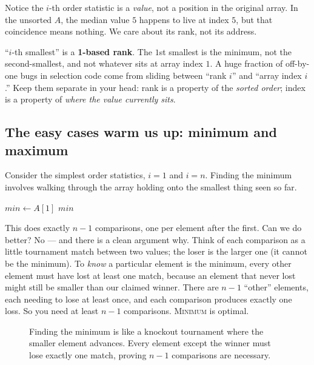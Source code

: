 Notice the $i$-th order statistic is a \emph{value}, not a position in the original
array. In the unsorted $A$, the median value $5$ happens to live at index $5$, but
that coincidence means nothing. We care about its rank, not its address.

\begin{trapbox}
``$i$-th smallest'' is a \textbf{1-based rank}. The $1$st smallest is the minimum,
not the second-smallest, and not whatever sits at array index $1$. A huge fraction
of off-by-one bugs in selection code come from sliding between ``rank $i$'' and
``array index $i$.'' Keep them separate in your head: rank is a property of the
\emph{sorted order}; index is a property of \emph{where the value currently sits}.
\end{trapbox}

\subsection{The easy cases warm us up: minimum and maximum}

Consider the simplest order statistics, $i=1$ and $i=n$. Finding the minimum involves walking through the array holding onto the smallest thing seen so far.

\begin{algorithm}[H]
\caption{\textsc{Minimum}$(A)$}\label{ch09:alg-minimum}
$\textit{min} \gets A[1]$\;
\Return $\textit{min}$\;
\end{algorithm}

This does exactly $n-1$ comparisons, one per element after the first. Can we do
better? No --- and there is a clean argument why. Think of each comparison as a
little tournament match between two values; the loser is the larger one (it cannot
be the minimum). To \emph{know} a particular element is the minimum, every other
element must have lost at least one match, because an element that never lost
might still be smaller than our claimed winner. There are $n-1$ ``other''
elements, each needing to lose at least once, and each comparison produces exactly
one loss. So you need at least $n-1$ comparisons. \textsc{Minimum} is optimal.

\begin{figure}[htbp]
\centering
{}
\caption{Finding the minimum is like a knockout tournament where the smaller element advances. Every element except the winner must lose exactly one match, proving $n-1$ comparisons are necessary.}
\label{ch09:fig-tournament}
\end{figure}


